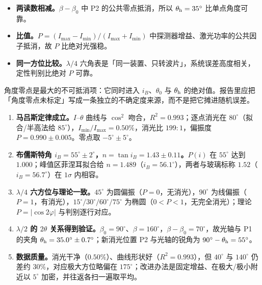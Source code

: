 \documentclass[11pt]{ctexart}
\begin{document}

\begin{itemize}
\item \textbf{两读数相减。}$\beta-\beta_0$ 中 P2 的公共零点抵消，所以 $\theta_{\rm h}=35^\circ$ 比单点角度可靠。
\item \textbf{比值。}$P=(I_{\max}-I_{\min})/(I_{\max}+I_{\min})$ 中探测器增益、激光功率的公共因子抵消，故 $P$ 比绝对光强稳。
\item \textbf{同一方位比较。}$\lambda/4$ 六角表是「同一装置、只转波片」，系统误差高度相关，定性判别比绝对 $P$ 可靠。
\end{itemize}


角度零点是最大的不可抵消项：它同时进入 $i_B$、$\theta_0$ 与 $\theta_{\rm h}$ 的绝对值。报告里应把「角度零点未标定」写成一条独立的不确定度来源，而不是把它摊进随机误差。


\begin{enumerate}
\item \textbf{马吕斯定律成立。}$I$--$\theta$ 曲线与 $\cos^2$ 吻合，$R^2=0.993$；逐点消光在 $80^\circ$（拟合/半高法给 $85^\circ$），$I_{\min}/I_{\max}=0.50\%$，消光比 $199:1$，偏振度 $P=0.990\pm0.005$。零点取 $-5^\circ\pm5^\circ$。
\item \textbf{布儒斯特角 $i_B=55^\circ\pm2^\circ$，$n=\tan i_B=1.43\pm0.11$。}$P(i)$ 在 $55^\circ$ 达到 $1.000$；峰值区菲涅耳拟合给 $n=1.489$（$i_B=56.1^\circ$），两者与玻璃标称 $1.52$（$i_B=56.7^\circ$）在 $1\sigma$ 内相容。
\item \textbf{$\lambda/4$ 六方位与理论一致。}$45^\circ$ 为圆偏振（$P=0$，无消光），$90^\circ$ 为线偏振（$P=1$，有消光），$15^\circ/30^\circ/60^\circ/75^\circ$ 为椭圆（$0<P<1$，无完全消光）；理论 $P=|\cos2\varphi|$ 与判别逐行对应。
\item \textbf{$\lambda/2$ 的 $2\theta$ 关系得到验证。}$\beta_0=90^\circ$、$\beta=160^\circ$，$\beta-\beta_0=70^\circ$，故光轴与 P1 的夹角 $\theta_{\rm h}=35.0^\circ\pm0.7^\circ$；新消光位置 P2 与光轴的锐角为 $90^\circ-\theta_{\rm h}=55^\circ$。
\item \textbf{数据质量。}消光干净（$0.50\%$）、曲线形状好（$R^2=0.993$），但 $40^\circ$ 与 $140^\circ$ 仍差约 $30\%$，对应极大方位略偏在 $175^\circ$；改进办法是固定增益、在极大/极小附近以 $5^\circ$ 加密，并往返各扫一遍取平均。
\end{enumerate}
\end{document}
